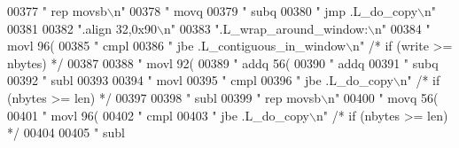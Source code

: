 \begin{DoxyCode}
{{{{{{{{{{{{{{{{{{{{{{{{{{{{{{{{{{{{{{{{{{{{{{{{{{{{{{{{{{{{{{{{{{{{{{{{{{{{{{{{{{{{{{{{{{{{{{{{{{{{{{{{{{{{{{{{{{{{{{{{{{{{{{{{{{{{{{{{{{00377 \textcolor{stringliteral}{"        rep     movsb\(\backslash\)n"}
00378 \textcolor{stringliteral}{"        movq    %
00379 \textcolor{stringliteral}{"        subq    %
00380 \textcolor{stringliteral}{"        jmp     .L\_do\_copy\(\backslash\)n"}
00381 
00382 \textcolor{stringliteral}{".align 32,0x90\(\backslash\)n"}
00383 \textcolor{stringliteral}{".L\_wrap\_around\_window:\(\backslash\)n"}
00384 \textcolor{stringliteral}{"        movl    96(%
00385 \textcolor{stringliteral}{"        cmpl    %
00386 \textcolor{stringliteral}{"        jbe     .L\_contiguous\_in\_window\(\backslash\)n"} \textcolor{comment}{/* if (write >= nbytes) */}
00387 
00388 \textcolor{stringliteral}{"        movl    92(%
00389 \textcolor{stringliteral}{"        addq    56(%
00390 \textcolor{stringliteral}{"        addq    %
00391 \textcolor{stringliteral}{"        subq    %
00392 \textcolor{stringliteral}{"        subl    %
00393 
00394 \textcolor{stringliteral}{"        movl    %
00395 \textcolor{stringliteral}{"        cmpl    %
00396 \textcolor{stringliteral}{"        jbe     .L\_do\_copy\(\backslash\)n"}           \textcolor{comment}{/* if (nbytes >= len) */}
00397 
00398 \textcolor{stringliteral}{"        subl    %
00399 \textcolor{stringliteral}{"        rep     movsb\(\backslash\)n"}
00400 \textcolor{stringliteral}{"        movq    56(%
00401 \textcolor{stringliteral}{"        movl    96(%
00402 \textcolor{stringliteral}{"        cmpl    %
00403 \textcolor{stringliteral}{"        jbe     .L\_do\_copy\(\backslash\)n"}           \textcolor{comment}{/* if (nbytes >= len) */}
00404 
00405 \textcolor{stringliteral}{"        subl    %
}}}}}}}}}}}}}}}}}}}}}}}}}}}}}}}}}}}}}}}}}}}}}}}}}}}}}}}}}}}}}}}}}}}}}}}}}}}}}}}}}}}}}}}}}}}}}}}}}}}}}}}}}}}}}}}}}}}}}}}}}}}}}}}}}}}}}}}}}}}}}}}}}}}}}}}}}}
\end{DoxyCode}

